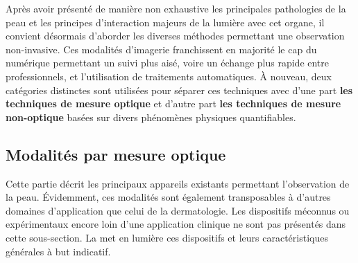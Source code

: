Après avoir présenté de manière non exhaustive les principales pathologies de la peau et les principes d'interaction majeurs de la lumière avec cet organe, il convient désormais d'aborder les diverses méthodes permettant une observation non-invasive. Ces modalités d'imagerie franchissent en majorité le cap du numérique permettant un suivi plus aisé, voire un échange plus rapide entre professionnels, et l’utilisation de traitements automatiques. À nouveau, deux catégories distinctes sont utilisées pour séparer ces techniques avec d’une part \textbf{les techniques de mesure optique} et d'autre part \textbf{les techniques de mesure non-optique} basées sur divers phénomènes physiques quantifiables.\par

\subsection{Modalités par mesure optique}
Cette partie décrit les principaux appareils existants permettant l'observation de la peau. Évidemment, ces modalités sont également transposables à d'autres domaines d'application que celui de la dermatologie. Les dispositifs méconnus ou expérimentaux encore loin d'une application clinique ne sont pas présentés dans cette sous-section. La  met en lumière ces dispositifs et leurs caractéristiques générales à but indicatif.\par

